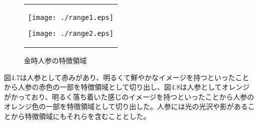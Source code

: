 \begin{figure}[htbp]
  \begin{center}
    \begin{tabular}{c}

      \begin{minipage}{0.45\hsize}
        \begin{center}
          \texttt{[image: ./range1.eps]}
          \caption{西洋人参の特徴領域}
          \label{fig:seiyou}
        \end{center}
      \end{minipage}

      \begin{minipage}{0.45\hsize}
        \begin{center}
          \texttt{[image: ./range2.eps]}
          \caption{金時人参の特徴領域}
          \label{fig:seiyou}
        \end{center}
      \end{minipage}

    \end{tabular}
  \end{center}
\end{figure}
図4.7は人参として赤みがあり、明るくて鮮やかなイメージを持つといったことから人参の赤色の一部を特徴領域として切り出し、図4.8は人参としてオレンジがかっており、明るく落ち着いた感じのイメージを持つといったことから人参のオレンジ色の一部を特徴領域として切り出した。人参には光の光沢や影があることから特徴領域にもそれらを含むこととした。\par
 
